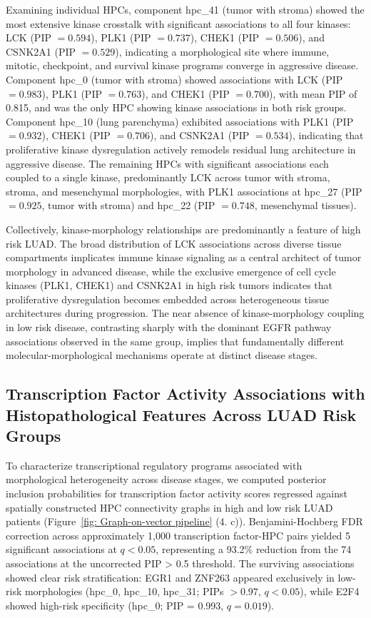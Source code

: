 \documentclass[pdflatex,article,12pt]{article}
\begin{document}
Examining individual HPCs, component hpc\_41 (tumor with stroma) showed the most extensive kinase crosstalk with significant associations to all four kinases: LCK (PIP $= 0.594$), PLK1 (PIP $= 0.737$), CHEK1 (PIP $= 0.506$), and CSNK2A1 (PIP $= 0.529$), indicating a morphological site where immune, mitotic, checkpoint, and survival kinase programs converge in aggressive disease. Component hpc\_0 (tumor with stroma) showed associations with LCK (PIP $= 0.983$), PLK1 (PIP $= 0.763$), and CHEK1 (PIP $= 0.700$), with mean PIP of 0.815, and was the only HPC showing kinase associations in both risk groups. Component hpc\_10 (lung parenchyma) exhibited associations with PLK1 (PIP $= 0.932$), CHEK1 (PIP $= 0.706$), and CSNK2A1 (PIP $= 0.534$), indicating that proliferative kinase dysregulation actively remodels residual lung architecture in aggressive disease. The remaining HPCs with significant associations each coupled to a single kinase, predominantly LCK across tumor with stroma, stroma, and mesenchymal morphologies, with PLK1 associations at hpc\_27 (PIP $= 0.925$, tumor with stroma) and hpc\_22 (PIP $= 0.748$, mesenchymal tissues).

Collectively, kinase-morphology relationships are predominantly a feature of high risk LUAD. The broad distribution of LCK associations across diverse tissue compartments implicates immune kinase signaling as a central architect of tumor morphology in advanced disease, while the exclusive emergence of cell cycle kinases (PLK1, CHEK1) and CSNK2A1 in high risk tumors indicates that proliferative dysregulation becomes embedded across heterogeneous tissue architectures during progression. The near absence of kinase-morphology coupling in low risk disease, contrasting sharply with the dominant EGFR pathway associations observed in the same group, implies that fundamentally different molecular-morphological mechanisms operate at distinct disease stages.

\subsection{Transcription Factor Activity Associations with Histopathological Features Across LUAD Risk Groups}

To characterize transcriptional regulatory programs associated with morphological heterogeneity across disease stages, we computed posterior inclusion probabilities for transcription factor activity scores regressed against spatially constructed HPC connectivity graphs in high and low risk LUAD patients (Figure~\ref{fig: Graph-on-vector pipeline} (4. c)). Benjamini-Hochberg FDR correction across approximately 1,000 transcription factor-HPC pairs yielded 5 significant associations at $q < 0.05$, representing a 93.2\% reduction from the 74 associations at the uncorrected PIP > 0.5 threshold. The surviving associations showed clear risk stratification: EGR1 and ZNF263 appeared exclusively in low-risk morphologies (hpc\_0, hpc\_10, hpc\_31; PIPs $> 0.97$, $q < 0.05$), while E2F4 showed high-risk specificity (hpc\_0; PIP = 0.993, $q = 0.019$).
\end{document}
